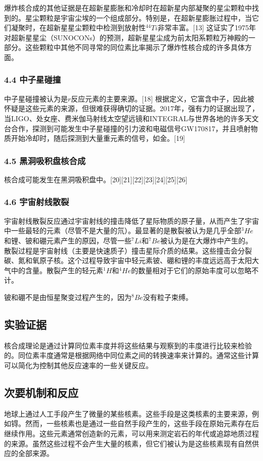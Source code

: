 爆炸核合成的其他证据是在超新星膨胀和冷却时在超新星内部凝聚的星尘颗粒中找到的。星尘颗粒是宇宙尘埃的一个组成部分。特别是，在超新星膨胀过程中，当它们凝聚时，在超新星星尘颗粒中检测到放射性$^{44}Ti$非常丰富。[13] 这证实了1975年对超新星星尘（SUNOCONs）的预测，超新星星尘成为前太阳系颗粒万神殿的一部分。这些颗粒中其他不同寻常的同位素比率揭示了爆炸性核合成的许多具体方面。
\subsubsection{4.4 中子星碰撞}
中子星碰撞被认为是$r$反应元素的主要来源。[18] 根据定义，它富含中子，因此被怀疑是这些元素的来源，但很难获得确切的证据。2017年，强有力的证据出现了，当LIGO、处女座、费米伽马射线太空望远镜和INTEGRAL与世界各地的许多天文台合作，探测到可能发生中子星碰撞的引力波和电磁信号GW170817，并且喷射物质开始冷却时，随后探测到大量重元素的信号，如金。[19]
\subsubsection{4.5 黑洞吸积盘核合成}
核合成可能发生在黑洞吸积盘中。[20][21][22][23][24][25][26]
\subsubsection{4.6 宇宙射线散裂}
宇宙射线散裂反应通过宇宙射线的撞击降低了星际物质的原子量，从而产生了宇宙中一些最轻的元素（尽管不是大量的氘）。最显著的是散裂被认为是几乎全部$^3He$和锂、铍和硼元素产生的原因，尽管一些$^7Li$和$^7Be$被认为是在大爆炸中产生的。散裂过程是宇宙射线（主要是快速质子）撞击星际介质的结果。这些撞击会分裂碳、氮和氧原子核。这个过程导致宇宙中轻元素铍、硼和锂的丰度远远高于太阳大气中的含量。散裂产生的轻元素$^1H$和$^4He$的数量相对于它们的原始丰度可以忽略不计。

铍和硼不是由恒星聚变过程产生的，因为$^8Be$没有粒子束缚。

\subsection{实验证据}
核合成理论是通过计算同位素丰度并将这些结果与观察到的丰度进行比较来检验的。同位素丰度通常是根据网络中同位素之间的转换速率来计算的。通常这些计算可以简化为控制其他反应速率的一些关键反应。

\subsection{次要机制和反应}
地球上通过人工手段产生了微量的某些核素。这些手段是这类核素的主要来源，例如锝。然而，一些核素也是通过一些自然手段产生的，这些手段在原始元素存在后继续作用。这些元素通常创造新的元素，可以用来测定岩石的年代或追踪地质过程的来源。虽然这些过程不会产生大量的核素，但它们被认为是这些核素现有自然供应的全部来源。

